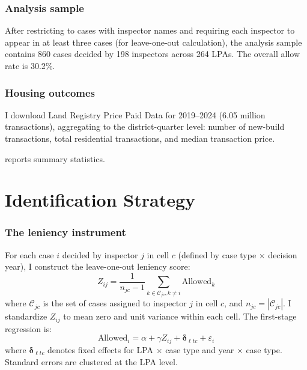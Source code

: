 \documentclass[12pt]{article}
\begin{document}
\subsubsection*{Analysis sample} After restricting to cases with inspector names and requiring each inspector to appear in at least three cases (for leave-one-out calculation), the analysis sample contains 860 cases decided by 198 inspectors across 264 LPAs. The overall allow rate is 30.2\%.

\subsubsection*{Housing outcomes} I download Land Registry Price Paid Data for 2019--2024 (6.05 million transactions), aggregating to the district-quarter level: number of new-build transactions, total residential transactions, and median transaction price.

 reports summary statistics.



\section{Identification Strategy}
\label{sec:design}

\subsubsection*{The leniency instrument} For each case $i$ decided by inspector $j$ in cell $c$ (defined by case type $\times$ decision year), I construct the leave-one-out leniency score:
\begin{equation}
Z_{ij} = \frac{1}{n_{jc} - 1}\sum_{k \in \mathcal{C}_{jc}, k \neq i} \text{Allowed}_k
\label{eq:leniency}
\end{equation}
where $\mathcal{C}_{jc}$ is the set of cases assigned to inspector $j$ in cell $c$, and $n_{jc} = |\mathcal{C}_{jc}|$. I standardize $Z_{ij}$ to mean zero and unit variance within each cell. The first-stage regression is:
\begin{equation}
\text{Allowed}_{i} = \alpha + \gamma Z_{ij} + \boldsymbol{\delta}_{\ell t c} + \varepsilon_i
\label{eq:first_stage}
\end{equation}
where $\boldsymbol{\delta}_{\ell t c}$ denotes fixed effects for LPA $\times$ case type and year $\times$ case type. Standard errors are clustered at the LPA level.
\end{document}
